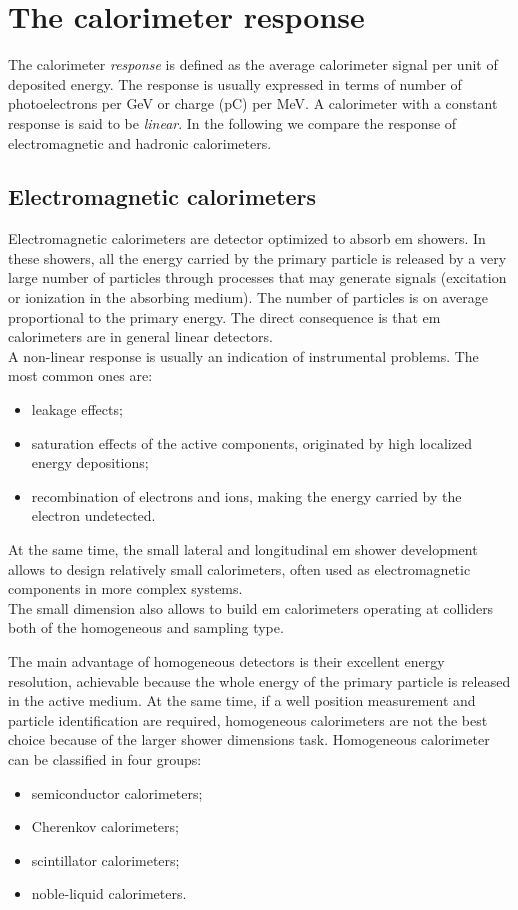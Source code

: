 \section{The calorimeter response}
The calorimeter \textit{response} is defined as the average calorimeter signal per unit of deposited energy. The response is usually expressed in terms of number of photoelectrons per GeV or charge (pC) per MeV.
A calorimeter with a constant response is said to be \textit{linear}.
In the following we compare the response of electromagnetic and hadronic calorimeters.\\

\subsection*{Electromagnetic calorimeters}
Electromagnetic calorimeters are detector optimized to absorb em showers. In these showers, all the energy carried by the primary particle is released by a very large number of particles through processes that may generate signals (excitation or ionization in the absorbing medium). The number of particles is on average proportional to the primary energy. The direct consequence is that em calorimeters are in general linear detectors.\\
A non-linear response is usually an indication of instrumental problems. The most common ones are:
\begin{itemize}
    \item leakage effects;
    \item saturation effects of the active components, originated by high localized energy depositions;
    \item recombination of electrons and ions, making the energy carried by the electron undetected.
\end{itemize}

At the same time, the small lateral and longitudinal em shower development allows to design relatively small calorimeters, often used as electromagnetic components in more complex systems.\\

The small dimension also allows to build em calorimeters operating at colliders both of the homogeneous and sampling type.

The main advantage of homogeneous detectors is their excellent energy resolution, achievable because the whole energy of the primary particle is released in the active medium. At the same time, if a well position measurement and particle identification are required, homogeneous calorimeters are not the best choice because of the larger shower dimensions task. 
Homogeneous calorimeter can be classified in four groups:
\begin{itemize}
    \item semiconductor calorimeters;
    \item Cherenkov calorimeters;
    \item scintillator calorimeters;
    \item noble-liquid calorimeters.
\end{itemize}

